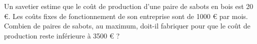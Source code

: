 
Un savetier estime que le coût de production d'une paire de sabots en bois est 20 €. Les coûts fixes de fonctionnement de son entreprise sont de 1000 € par mois. 
Combien de paires de sabots, au maximum, doit-il fabriquer pour que le coût de production reste inférieure à 3500 €  ?